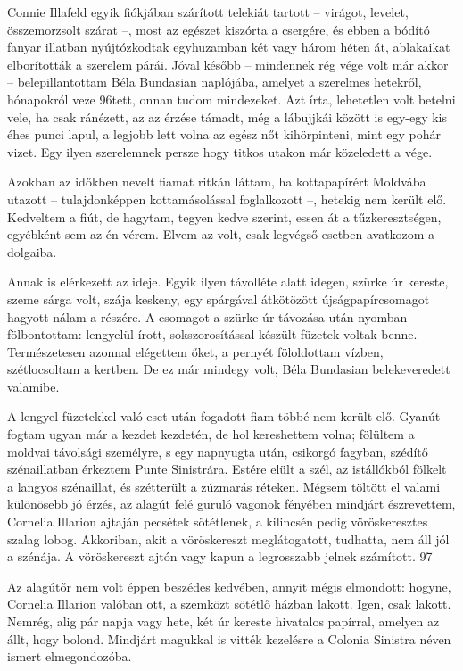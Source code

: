 \documentclass{IEEEtran}
\begin{document}
Connie Illafeld egyik fiókjában szárított telekiát tartott – virágot, levelet,
összemorzsolt szárat –, most az egészet kiszórta a csergére, és ebben a bódító
fanyar illatban nyújtózkodtak egyhuzamban két vagy három héten át, ablakaikat
elborították a szerelem párái. Jóval később – mindennek rég vége volt már
akkor – belepillantottam Béla Bundasian naplójába, amelyet a szerelmes
hetekről, hónapokról veze 96tett, onnan tudom mindezeket. Azt írta, lehetetlen
volt betelni vele, ha csak ránézett, az az érzése támadt, még a lábujjkái
között is egy-egy kis éhes punci lapul, a legjobb lett volna az egész nőt
kihörpinteni, mint egy pohár vizet. Egy ilyen szerelemnek persze hogy titkos
utakon már közeledett a vége.

Azokban az időkben nevelt fiamat ritkán láttam, ha kottapapírért Moldvába
utazott – tulajdonképpen kottamásolással foglalkozott –, hetekig nem került
elő. Kedveltem a fiút, de hagytam, tegyen kedve szerint, essen át a
tűzkeresztségen, egyébként sem az én vérem. Elvem az volt, csak legvégső
esetben avatkozom a dolgaiba.

Annak is elérkezett az ideje. Egyik ilyen távolléte alatt idegen, szürke úr
kereste, szeme sárga volt, szája keskeny, egy spárgával átkötözött
újságpapírcsomagot hagyott nálam a részére. A csomagot a szürke úr távozása
után nyomban fölbontottam: lengyelül írott, sokszorosítással készült füzetek
voltak benne. Természetesen azonnal elégettem őket, a pernyét föloldottam
vízben, szétlocsoltam a kertben. De ez már mindegy volt, Béla Bundasian
belekeveredett valamibe.

A lengyel füzetekkel való eset után fogadott fiam többé nem került elő. Gyanút
fogtam ugyan már a kezdet kezdetén, de hol kereshettem volna; fölültem a
moldvai távolsági személyre, s egy napnyugta után, csikorgó fagyban, szédítő
szénaillatban érkeztem Punte Sinistrára. Estére elült a szél, az istállókból
fölkelt a langyos szénaillat, és szétterült a zúzmarás réteken. Mégsem töltött
el valami különösebb jó érzés, az alagút felé guruló vagonok fényében mindjárt
észrevettem, Cornelia Illarion ajtaján pecsétek sötétlenek, a kilincsén pedig
vöröskeresztes szalag lobog. Akkoriban, akit a vöröskereszt meglátogatott,
tudhatta, nem áll jól a szénája. A vöröskereszt ajtón vagy kapun a legrosszabb
jelnek számított.
97

Az alagútőr nem volt éppen beszédes kedvében, annyit mégis elmondott: hogyne,
Cornelia Illarion valóban ott, a szemközt sötétlő házban lakott. Igen, csak
lakott. Nemrég, alig pár napja vagy hete, két úr kereste hivatalos papírral,
amelyen az állt, hogy bolond. Mindjárt magukkal is vitték kezelésre a Colonia
Sinistra néven ismert elmegondozóba.
\end{document}
